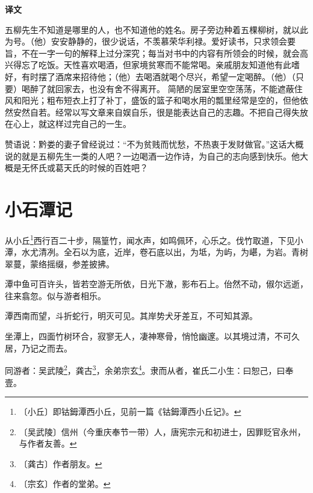 \documentclass[12pt,UTF-8,openany,a4]{ctexbook}
\begin{document}
\newpage

\begin{Large}
    \noindent\textbf{译文}
\end{Large}


\vspace{1em}

\begin{large}
    \yiwen 
    五柳先生不知道是哪里的人，也不知道他的姓名。房子旁边种着五棵柳树，就以此为号。（他）安安静静的，很少说话，不羡慕荣华利禄。爱好读书，只求领会要旨，不在一字一句的解释上过分深究；每当对书中的内容有所领会的时候，就会高兴得忘了吃饭。天性喜欢喝酒，但家境贫寒而不能常喝。亲戚朋友知道他有此嗜好，有时摆了酒席来招待他；（他）去喝酒就喝个尽兴，希望一定喝醉。（他）（只要）喝醉了就回家去，也没有舍不得离开。 简陋的居室里空空荡荡，不能遮蔽住风和阳光；粗布短衣上打了补丁，盛饭的篮子和喝水用的瓢里经常是空的，但他依然安然自若。经常以写文章来自娱自乐，很是能表达自己的志趣。不把自己得失放在心上，就这样过完自己的一生。
    
    赞语说：黔娄的妻子曾经说过：“不为贫贱而忧愁，不热衷于发财做官。”这话大概说的就是五柳先生一类的人吧？一边喝酒一边作诗，为自己的志向感到快乐。他大概是无怀氏或葛天氏的时候的百姓吧？
    
\end{large}



\chapter{小石潭记}

\begin{large}
    
    从小丘\footnote{〔小丘〕\yiwen 即钴鉧潭西小丘，见前一篇《钴鉧潭西小丘记》。}西行百二十步，隔篁竹，闻水声，如鸣佩环，心乐之。伐竹取道，下见小潭，水尤清冽。全石以为底，近岸，卷石底以出，为坻，为屿，为嵁，为岩。青树翠蔓，蒙络摇缀，参差披拂。
    
    潭中鱼可百许头，皆若空游无所依，日光下澈，影布石上。佁然不动，俶尔远逝，往来翕忽。似与游者相乐。
    
    潭西南而望，斗折蛇行，明灭可见。其岸势犬牙差互，不可知其源。
    
    坐潭上，四面竹树环合，寂寥无人，凄神寒骨，悄怆幽邃。以其境过清，不可久居，乃记之而去。
    
    同游者：吴武陵\footnote{〔吴武陵〕\yiwen 信州（今重庆奉节一带）人，唐宪宗元和初进士，因罪贬官永州，与作者友善。}，龚古\footnote{〔龚古〕\yiwen 作者朋友。}，余弟宗玄\footnote{〔宗玄〕\yiwen 作者的堂弟。}。隶而从者，崔氏二小生：曰恕己，曰奉壹。
\end{large}
\end{document}

